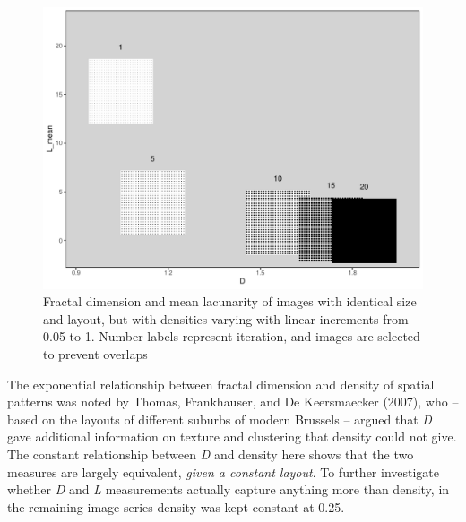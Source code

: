 \documentclass[
  12pt,
  a4paper, twoside]{book}
\begin{document}
\begin{figure}

{\centering \includegraphics[width=0.9\linewidth]{Results/fig08_dens_im} 

}

\caption[Effect of pixel density on D and L]{Fractal dimension and mean lacunarity of images with identical size and layout, but with densities varying with linear increments from 0.05 to 1. Number labels represent iteration, and images are selected to prevent overlaps}\label{fig:08-dens-im}
\end{figure}

The exponential relationship between fractal dimension and density of spatial patterns was noted by Thomas, Frankhauser, and De Keersmaecker (2007), who -- based on the layouts of different suburbs of modern Brussels -- argued that \emph{D} gave additional information on texture and clustering that density could not give. The constant relationship between \emph{D} and density here shows that the two measures are largely equivalent, \emph{given a constant layout}. To further investigate whether \emph{D} and \emph{L} measurements actually capture anything more than density, in the remaining image series density was kept constant at 0.25.
\end{document}
